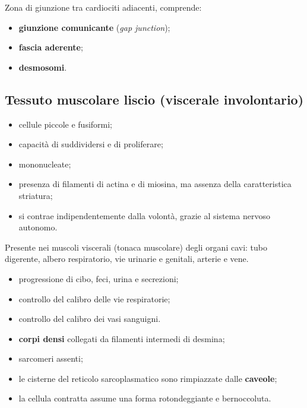 Zona di giunzione tra cardiociti adiacenti, comprende:
\begin{itemize}
  \item \textbf{giunzione comunicante} (\textit{gap junction});
  \item \textbf{fascia aderente};
  \item \textbf{desmosomi}.
\end{itemize}

\subsection{Tessuto muscolare liscio (viscerale involontario)}

\begin{itemize}
  \item cellule piccole e fusiformi;
  \item capacità di suddividersi e di proliferare;
  \item mononucleate;
  \item presenza di filamenti di actina e di miosina, ma assenza della caratteristica striatura;
  \item si contrae indipendentemente dalla volontà, grazie al sistema nervoso autonomo.
\end{itemize}
Presente nei muscoli viscerali (tonaca muscolare) degli organi cavi: tubo digerente, albero respiratorio, vie urinarie e genitali, arterie e vene.

\begin{itemize}
  \item progressione di cibo, feci, urina e secrezioni;
  \item controllo del calibro delle vie respiratorie;
  \item controllo del calibro dei vasi sanguigni.
\end{itemize}

\begin{itemize}
  \item \textbf{corpi densi} collegati da filamenti intermedi di desmina;
  \item sarcomeri assenti;
  \item le cisterne del reticolo sarcoplasmatico sono rimpiazzate dalle \textbf{caveole};
  \item la cellula contratta assume una forma rotondeggiante e bernoccoluta.
\end{itemize}

